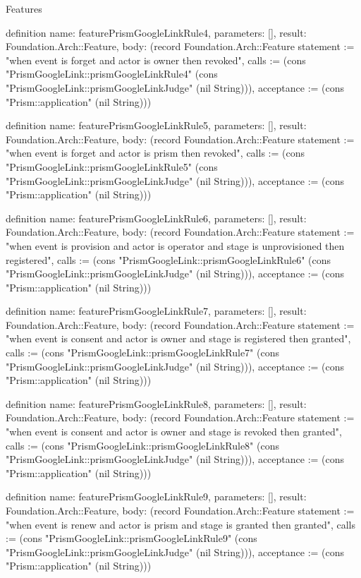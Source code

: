\begin{lexlean}{Features}
\begin{semanticmodule}
definition{
  name: featurePrismGoogleLinkRule4,
  parameters: [],
  result: Foundation.Arch::Feature,
  body: (record Foundation.Arch::Feature {statement := "when event is forget and actor is owner then revoked", calls := (cons "PrismGoogleLink::prismGoogleLinkRule4" (cons "PrismGoogleLink::prismGoogleLinkJudge" (nil String))), acceptance := (cons "Prism::application" (nil String))})
}

definition{
  name: featurePrismGoogleLinkRule5,
  parameters: [],
  result: Foundation.Arch::Feature,
  body: (record Foundation.Arch::Feature {statement := "when event is forget and actor is prism then revoked", calls := (cons "PrismGoogleLink::prismGoogleLinkRule5" (cons "PrismGoogleLink::prismGoogleLinkJudge" (nil String))), acceptance := (cons "Prism::application" (nil String))})
}

definition{
  name: featurePrismGoogleLinkRule6,
  parameters: [],
  result: Foundation.Arch::Feature,
  body: (record Foundation.Arch::Feature {statement := "when event is provision and actor is operator and stage is unprovisioned then registered", calls := (cons "PrismGoogleLink::prismGoogleLinkRule6" (cons "PrismGoogleLink::prismGoogleLinkJudge" (nil String))), acceptance := (cons "Prism::application" (nil String))})
}

definition{
  name: featurePrismGoogleLinkRule7,
  parameters: [],
  result: Foundation.Arch::Feature,
  body: (record Foundation.Arch::Feature {statement := "when event is consent and actor is owner and stage is registered then granted", calls := (cons "PrismGoogleLink::prismGoogleLinkRule7" (cons "PrismGoogleLink::prismGoogleLinkJudge" (nil String))), acceptance := (cons "Prism::application" (nil String))})
}

definition{
  name: featurePrismGoogleLinkRule8,
  parameters: [],
  result: Foundation.Arch::Feature,
  body: (record Foundation.Arch::Feature {statement := "when event is consent and actor is owner and stage is revoked then granted", calls := (cons "PrismGoogleLink::prismGoogleLinkRule8" (cons "PrismGoogleLink::prismGoogleLinkJudge" (nil String))), acceptance := (cons "Prism::application" (nil String))})
}

definition{
  name: featurePrismGoogleLinkRule9,
  parameters: [],
  result: Foundation.Arch::Feature,
  body: (record Foundation.Arch::Feature {statement := "when event is renew and actor is prism and stage is granted then granted", calls := (cons "PrismGoogleLink::prismGoogleLinkRule9" (cons "PrismGoogleLink::prismGoogleLinkJudge" (nil String))), acceptance := (cons "Prism::application" (nil String))})
}


\end{semanticmodule}
\end{lexlean}
